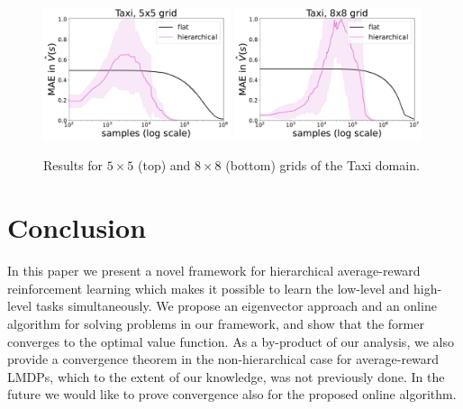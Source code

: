 \begin{figure}[!hb]
  \begin{center}
      \includegraphics*[width=0.49\textwidth]{figures/chapter2/taxi_5.pdf}
      \includegraphics*[width=0.49\textwidth]{figures/chapter2/taxi_8.pdf}
      \caption{Results for $5 \times 5$ (top) and $8 \times 8$ (bottom) grids of the Taxi domain.}
        \label{fig:taxi}
  \end{center}
\end{figure}

\section{Conclusion}

In this paper we present a novel framework for hierarchical average-reward reinforcement learning which makes it possible to learn the low-level and high-level tasks simultaneously. 
We propose an eigenvector approach and an online algorithm for solving problems in our framework, and show that the former converges to the optimal value function. As a by-product of our analysis, we also provide a convergence theorem in the non-hierarchical case for average-reward LMDPs, which to the extent of our knowledge, was not previously done. In the future we would like to prove convergence also for the proposed online algorithm.
